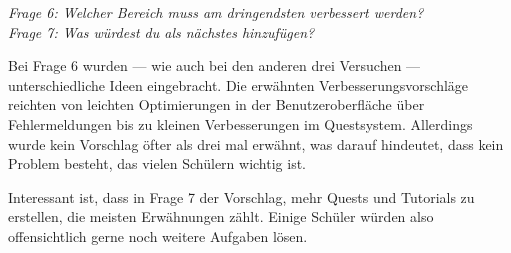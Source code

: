 \emph{Frage 6: Welcher Bereich muss am dringendsten verbessert werden?\\
Frage 7: Was würdest du als nächstes hinzufügen?}

Bei Frage 6 wurden --- wie auch bei den anderen drei Versuchen --- unterschiedliche Ideen eingebracht. Die erwähnten Verbesserungsvorschläge reichten von leichten Optimierungen in der Benutzeroberfläche über Fehlermeldungen bis zu kleinen Verbesserungen im Questsystem. Allerdings wurde kein Vorschlag öfter als drei mal erwähnt, was darauf hindeutet, dass kein Problem besteht, das vielen Schülern wichtig ist.

Interessant ist, dass in Frage 7 der Vorschlag, mehr Quests und Tutorials zu erstellen, die meisten Erwähnungen zählt. Einige Schüler würden also offensichtlich gerne noch weitere Aufgaben lösen.

